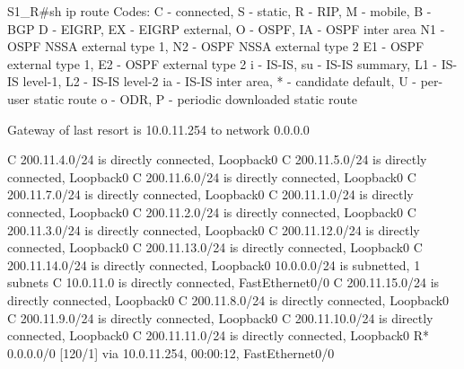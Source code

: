 \documentclass[10pt]{article}
\begin{document}
\begin{itemize}
\begin{verbatim*}
		S1_R#sh ip route
		Codes: C - connected, S - static, R - RIP, M - mobile, B - BGP
		       D - EIGRP, EX - EIGRP external, O - OSPF, IA - OSPF inter area
		       N1 - OSPF NSSA external type 1, N2 - OSPF NSSA external type 2
		       E1 - OSPF external type 1, E2 - OSPF external type 2
		       i - IS-IS, su - IS-IS summary, L1 - IS-IS level-1, L2 - IS-IS level-2
		       ia - IS-IS inter area, * - candidate default, U - per-user static route
		       o - ODR, P - periodic downloaded static route

		Gateway of last resort is 10.0.11.254 to network 0.0.0.0

		C    200.11.4.0/24 is directly connected, Loopback0
		C    200.11.5.0/24 is directly connected, Loopback0
		C    200.11.6.0/24 is directly connected, Loopback0
		C    200.11.7.0/24 is directly connected, Loopback0
		C    200.11.1.0/24 is directly connected, Loopback0
		C    200.11.2.0/24 is directly connected, Loopback0
		C    200.11.3.0/24 is directly connected, Loopback0
		C    200.11.12.0/24 is directly connected, Loopback0
		C    200.11.13.0/24 is directly connected, Loopback0
		C    200.11.14.0/24 is directly connected, Loopback0
		     10.0.0.0/24 is subnetted, 1 subnets
		C       10.0.11.0 is directly connected, FastEthernet0/0
		C    200.11.15.0/24 is directly connected, Loopback0
		C    200.11.8.0/24 is directly connected, Loopback0
		C    200.11.9.0/24 is directly connected, Loopback0
		C    200.11.10.0/24 is directly connected, Loopback0
		C    200.11.11.0/24 is directly connected, Loopback0
		R*   0.0.0.0/0 [120/1] via 10.0.11.254, 00:00:12, FastEthernet0/0
	\end{verbatim*}
\end{itemize}
\end{document}
